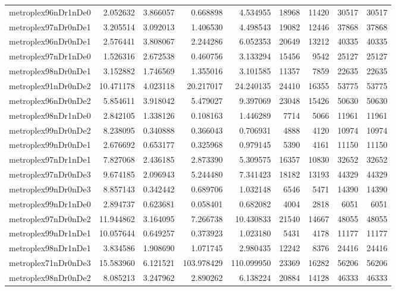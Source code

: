 \begin{longtable}{|l|r|r|r|r|r|r|r|r|}
metroplex96nDr1nDe0 & 2.052632 & 3.866057 & 0.668898 & 4.534955 & 18968 & 11420 & 30517 & 30517 \\
metroplex97nDr0nDe1 & 3.205514 & 3.092013 & 1.406530 & 4.498543 & 19082 & 12446 & 37868 & 37868 \\
metroplex96nDr0nDe1 & 2.576441 & 3.808067 & 2.244286 & 6.052353 & 20649 & 13212 & 40335 & 40335 \\
metroplex97nDr1nDe0 & 1.526316 & 2.672538 & 0.460756 & 3.133294 & 15456 & 9542 & 25127 & 25127 \\
metroplex98nDr0nDe1 & 3.152882 & 1.746569 & 1.355016 & 3.101585 & 11357 & 7859 & 22635 & 22635 \\
metroplex91nDr0nDe2 & 10.471178 & 4.023118 & 20.217017 & 24.240135 & 24410 & 16355 & 53775 & 53775 \\
metroplex96nDr0nDe2 & 5.854611 & 3.918042 & 5.479027 & 9.397069 & 23048 & 15426 & 50630 & 50630 \\
metroplex98nDr1nDe0 & 2.842105 & 1.338126 & 0.108163 & 1.446289 & 7714 & 5066 & 11961 & 11961 \\
metroplex99nDr0nDe2 & 8.238095 & 0.340888 & 0.366043 & 0.706931 & 4888 & 4120 & 10974 & 10974 \\
metroplex99nDr0nDe1 & 2.676692 & 0.653177 & 0.325968 & 0.979145 & 5390 & 4161 & 11150 & 11150 \\
metroplex97nDr1nDe1 & 7.827068 & 2.436185 & 2.873390 & 5.309575 & 16357 & 10830 & 32652 & 32652 \\
metroplex97nDr0nDe3 & 9.674185 & 2.096943 & 5.244480 & 7.341423 & 18182 & 13193 & 44329 & 44329 \\
metroplex99nDr0nDe3 & 8.857143 & 0.342442 & 0.689706 & 1.032148 & 6546 & 5471 & 14390 & 14390 \\
metroplex99nDr1nDe0 & 2.894737 & 0.623681 & 0.058401 & 0.682082 & 4004 & 2818 & 6051 & 6051 \\
metroplex97nDr0nDe2 & 11.944862 & 3.164095 & 7.266738 & 10.430833 & 21540 & 14667 & 48055 & 48055 \\
metroplex99nDr1nDe1 & 10.057644 & 0.649257 & 0.373923 & 1.023180 & 5431 & 4178 & 11177 & 11177 \\
metroplex98nDr1nDe1 & 3.834586 & 1.908690 & 1.071745 & 2.980435 & 12242 & 8376 & 24416 & 24416 \\
metroplex71nDr0nDe3 & 15.583960 & 6.121521 & 103.978429 & 110.099950 & 23369 & 16282 & 56206 & 56206 \\
metroplex98nDr0nDe2 & 8.085213 & 3.247962 & 2.890262 & 6.138224 & 20884 & 14128 & 46333 & 46333 \\

\end{longtable}

